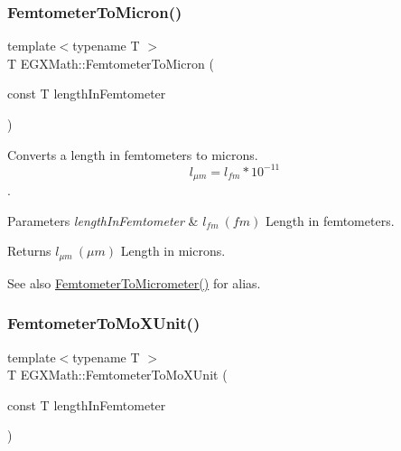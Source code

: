 \subsubsection{\texorpdfstring{Femtometer\+To\+Micron()}{FemtometerToMicron()}}
{\footnotesize\ttfamily template$<$typename T $>$ \\
T E\+G\+X\+Math\+::\+Femtometer\+To\+Micron (\begin{DoxyParamCaption}\item[{const T}]{length\+In\+Femtometer }\end{DoxyParamCaption})}



Converts a length in femtometers to microns. \[ l_{\mu m}=l_{fm} * 10^{-11} \]. 


\begin{DoxyParams}{Parameters}
{\em length\+In\+Femtometer} & $ l_{fm}\ (fm)$ Length in femtometers. \\
\hline
\end{DoxyParams}
\begin{DoxyReturn}{Returns}
$ l_{\mu m}\ (\mu m)$ Length in microns. 
\end{DoxyReturn}
\begin{DoxySeeAlso}{See also}
\mbox{\hyperlink{group___e_g_x_math-_conversions-_length_conversions-_femtometer-_s_i_gac965667884f7a3449072effb83260fe8}{Femtometer\+To\+Micrometer()}} for alias. 
\end{DoxySeeAlso}
\mbox{\label{group___e_g_x_math-_conversions-_length_conversions-_femtometer-_non-_s_i_ga57801d7c681362c1a11053233e31c415}} 
\subsubsection{\texorpdfstring{Femtometer\+To\+Mo\+X\+Unit()}{FemtometerToMoXUnit()}}
{\footnotesize\ttfamily template$<$typename T $>$ \\
T E\+G\+X\+Math\+::\+Femtometer\+To\+Mo\+X\+Unit (\begin{DoxyParamCaption}\item[{const T}]{length\+In\+Femtometer }\end{DoxyParamCaption})}



